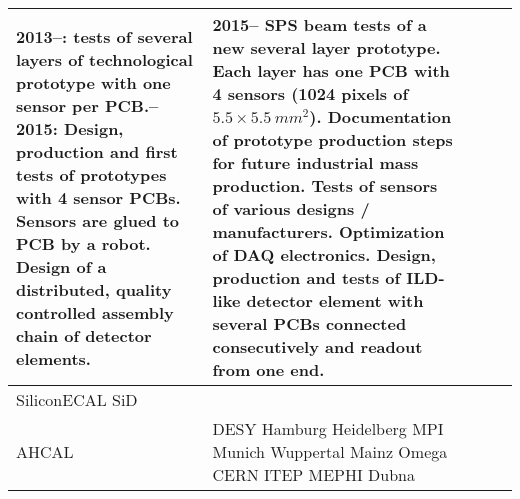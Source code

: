\begin{landscape}
\begin{adjustbox}{max width=1\textheight,totalheight=1\textwidth}
\begin{tabularx}{2\textheight}{lXXXX}
    2013--: tests of several layers of technological prototype with one sensor per PCB.\newline
    2014--2015: Design, production and first tests of prototypes with 4 sensor PCBs. Sensors are glued to PCB by a robot. Design of a distributed, quality controlled assembly chain of detector elements. &
    2015-- SPS beam tests of a new several layer prototype. Each layer has one PCB with 4 sensors (1024 pixels of $5.5\times \SI{5.5}{mm^2}$).\newline
    Documentation of prototype production steps for future industrial mass production.\newline
    Tests of sensors of various designs / manufacturers.\newline
    Optimization of DAQ electronics.\newline
    Design, production and tests of ILD-like detector element with several PCBs connected consecutively and readout from one end. \\
    \midrule
    SiliconECAL SiD &
    &                                                                                                                                                                                                                                                                                                                                                                                      &                                                                                                                                                                                                                                                                 &                                                                                                                                                                                                                                     \\
    \midrule
    AHCAL &
    DESY\newline
    Hamburg\newline
    Heidelberg\newline
    MPI Munich \newline
    Wuppertal\newline
    Mainz\newline
    Omega\newline
    CERN\newline
    ITEP\newline
    MEPHI\newline
    Dubna\newline

\end{tabularx}
\end{adjustbox}
\end{landscape}
